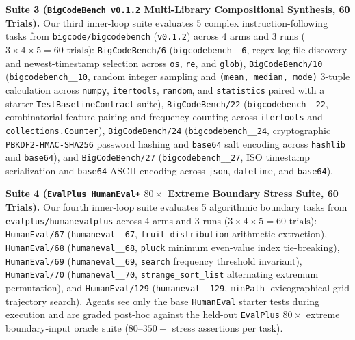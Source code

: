 \documentclass[11pt,a4paper,copyright]{google}
\begin{document}
\textbf{Suite 3 (\texttt{BigCodeBench v0.1.2} Multi-Library Compositional Synthesis, 60 Trials).} Our third inner-loop suite evaluates 5 complex instruction-following tasks from \texttt{bigcode/\allowbreak bigcodebench} (\texttt{v0.1.2}) \cite{zhuo2024bigcodebench} across 4 arms and 3 runs ($3 \times 4 \times 5 = 60\text{ trials}$): \texttt{BigCodeBench/6} (\texttt{bigcodebench\_\_6}, regex log file discovery and newest-timestamp selection across \texttt{os}, \texttt{re}, and \texttt{glob}), \texttt{BigCodeBench/10} (\texttt{bigcodebench\_\_10}, random integer sampling and \texttt{(mean, median, mode)} 3-tuple calculation across \texttt{numpy}, \texttt{itertools}, \texttt{random}, and \texttt{statistics} paired with a starter \texttt{TestBaselineContract} suite), \texttt{BigCodeBench/22} (\texttt{bigcodebench\_\_22}, combinatorial feature pairing and frequency counting across \texttt{itertools} and \texttt{collections.Counter}), \texttt{BigCodeBench/24} (\texttt{bigcodebench\_\_24}, cryptographic \texttt{PBKDF2-HMAC-SHA256} password hashing and \texttt{base64} salt encoding across \texttt{hashlib} and \texttt{base64}), and \texttt{BigCodeBench/27} (\texttt{bigcodebench\_\_27}, ISO timestamp serialization and \texttt{base64} ASCII encoding across \texttt{json}, \texttt{datetime}, and \texttt{base64}).

\textbf{Suite 4 (\texttt{EvalPlus HumanEval+} $80\times$ Extreme Boundary Stress Suite, 60 Trials).} Our fourth inner-loop suite evaluates 5 algorithmic boundary tasks from \texttt{evalplus/\allowbreak humanevalplus} \cite{liu2023evalplus} across 4 arms and 3 runs ($3 \times 4 \times 5 = 60\text{ trials}$): \texttt{HumanEval/67} (\texttt{humaneval\_\_67}, \texttt{fruit\_distribution} arithmetic extraction), \texttt{HumanEval/68} (\texttt{humaneval\_\_68}, \texttt{pluck} minimum even-value index tie-breaking), \texttt{HumanEval/69} (\texttt{humaneval\_\_69}, \texttt{search} frequency threshold invariant), \texttt{HumanEval/70} (\texttt{humaneval\_\_70}, \texttt{strange\_sort\_list} alternating extremum permutation), and \texttt{HumanEval/129} (\texttt{humaneval\_\_129}, \texttt{minPath} lexicographical grid trajectory search). Agents see only the base \texttt{HumanEval} starter tests during execution and are graded post-hoc against the held-out \texttt{EvalPlus} $80\times$ extreme boundary-input oracle suite ($80$--$350+$ stress assertions per task).
\end{document}
